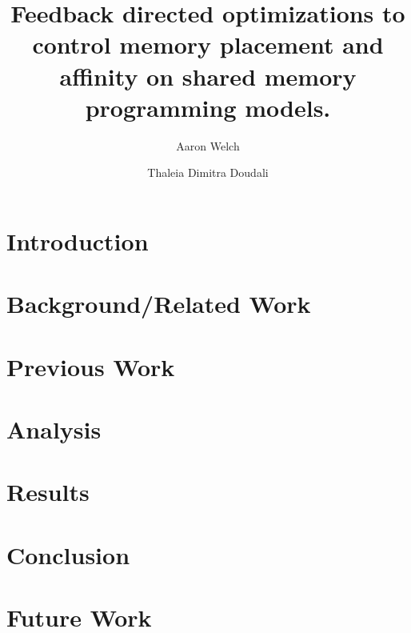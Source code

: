 \documentclass[runningheads]{llncs}
\begin{document}
\title{Feedback directed optimizations to control memory placement and affinity on shared memory programming models. }
\author{Aaron Welch \and  Thaleia Dimitra Doudali}

\maketitle
\begin{abstract}

\end{abstract}
\section{Introduction}
\label{sec:intro}

\section{Background/Related Work}
\label{sec:background}

\section{Previous Work}
\label{sec:prevwork}

\section{Analysis}
\label{sec:analysis}

\section{Results}
\label{sec:results}

\section{Conclusion}
\label{sec:conclusion}

\section{Future Work}
\label{sec:future}



\end{document}
